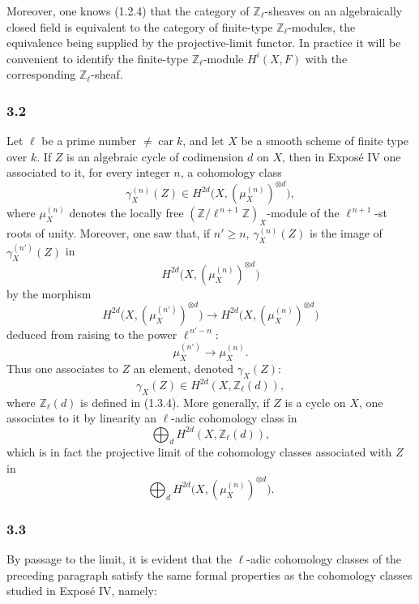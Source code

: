 \documentclass[11pt]{article}
\providecommand{\car}{\operatorname{car}}
\providecommand{\car}{\operatorname{car}}
\begin{document}
Moreover, one knows (1.2.4) that the category of \(\mathbb Z_\ell\)-sheaves on an algebraically closed field is equivalent to the category of finite-type \(\mathbb Z_\ell\)-modules, the equivalence being supplied by the projective-limit functor. In practice it will be convenient to identify the finite-type \(\mathbb Z_\ell\)-module \(H^i(X,F)\) with the corresponding \(\mathbb Z_\ell\)-sheaf.

\subsubsection*{3.2}
Let \(\ell\) be a prime number \(\ne\car k\), and let \(X\) be a smooth scheme of finite type over \(k\). If \(Z\) is an algebraic cycle of codimension \(d\) on \(X\), then in Exposé IV one associated to it, for every integer \(n\), a cohomology class
\[
\gamma_X^{(n)}(Z)\in H^{2d}\bigl(X,(\mu_X^{(n)})^{\otimes d}\bigr),
\]
where \(\mu_X^{(n)}\) denotes the locally free \((\mathbb Z/\ell^{\,n+1}\mathbb Z)_X\)-module of the \(\ell^{\,n+1}\)-st roots of unity. Moreover, one saw that, if \(n'\ge n\), \(\gamma_X^{(n)}(Z)\) is the image of \(\gamma_X^{(n')}(Z)\) in
\[
H^{2d}\bigl(X,(\mu_X^{(n)})^{\otimes d}\bigr)
\]
by the morphism
\[
H^{2d}\bigl(X,(\mu_X^{(n')})^{\otimes d}\bigr)
\longrightarrow
H^{2d}\bigl(X,(\mu_X^{(n)})^{\otimes d}\bigr)
\]
deduced from raising to the power \(\ell^{\,n'-n}\):
\[
\mu_X^{(n')}\longrightarrow \mu_X^{(n)}.
\]
Thus one associates to \(Z\) an element, denoted \(\gamma_X(Z)\):
\[
\gamma_X(Z)\in H^{2d}(X,\mathbb Z_\ell(d)),
\]
where \(\mathbb Z_\ell(d)\) is defined in (1.3.4). More generally, if \(Z\) is a cycle on \(X\), one associates to it by linearity an \(\ell\)-adic cohomology class in
\[
\bigoplus_d H^{2d}(X,\mathbb Z_\ell(d)),
\]
which is in fact the projective limit of the cohomology classes associated with \(Z\) in
\[
\bigoplus_d H^{2d}\bigl(X,(\mu_X^{(n)})^{\otimes d}\bigr).
\]

\subsubsection*{3.3}
By passage to the limit, it is evident that the \(\ell\)-adic cohomology classes of the preceding paragraph satisfy the same formal properties as the cohomology classes studied in Exposé IV, namely:
\end{document}
